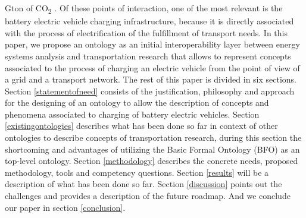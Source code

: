 Gton of CO\textsubscript{2} \cite{IEA.2023}. Of these points of interaction, one
of the most relevant is the battery electric vehicle charging infrastructure,
because it is directly associated with the process of electrification of the
fulfillment of transport needs. In this paper, we propose an ontology as an
initial interoperability layer between energy systems analysis and
transportation research that allows to represent concepts associated to the
process of charging an electric vehicle from the point of view of a grid and a
transport network. The rest of this paper is divided in six sections. Section
\ref{statementofneed} consists of the justification, philosophy and approach for
the designing of an ontology to allow the description of concepts and phenomena
associated to charging of battery electric vehicles. Section
\ref{existingontologies} describes what has been done so far in context of other
ontologies to describe concepts of transportation research, during this section
the shortcoming and advantages of utilizing the Basic Formal Ontology (BFO)
\cite{Arp.2015} as an top-level ontology. Section \ref{methodology} describes
the concrete needs, proposed methodology, tools and competency questions.
Section \ref{results} will be a description of what has been done so far.
Section \ref{discussion} points out the challenges and provides a description of
the future roadmap. And we conclude our paper in section \ref{conclusion}.

